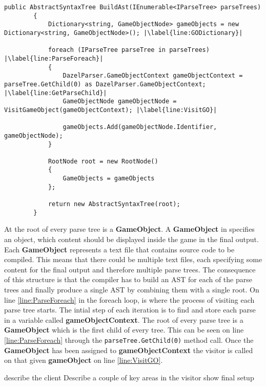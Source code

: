 \begin{lstlisting}[caption={The BuildAst method}, label={lst:BuildAstMethod},escapechar=|]
    public AbstractSyntaxTree BuildAst(IEnumerable<IParseTree> parseTrees)
        {
            Dictionary<string, GameObjectNode> gameObjects = new Dictionary<string, GameObjectNode>(); |\label{line:GODictionary}|
            
            foreach (IParseTree parseTree in parseTrees) |\label{line:ParseForeach}|
            {
                DazelParser.GameObjectContext gameObjectContext = parseTree.GetChild(0) as DazelParser.GameObjectContext; |\label{line:GetParseChild}|
                GameObjectNode gameObjectNode = VisitGameObject(gameObjectContext); |\label{line:VisitGO}|
                
                gameObjects.Add(gameObjectNode.Identifier, gameObjectNode);
            }

            RootNode root = new RootNode()
            {
                GameObjects = gameObjects
            };
            
            return new AbstractSyntaxTree(root);
        }
\end{lstlisting}

At the root of every parse tree is a \textbf{GameObject}. A \textbf{GameObject} in \dazel{} specifies an object, which content should be displayed inside the game in the final output. Each \textbf{GameObject} represents a text file that contains source code to be compiled. This means that there could be multiple text files, each specifying some content for the final output and therefore multiple parse trees. 
The consequence of this structure is that the compiler has to build an AST for each of the parse trees and finally produce a single AST by combining them with a single root. On line \ref{line:ParseForeach} in the foreach loop, is where the process of visiting each parse tree starts. 
The intial step of each iteration is to find and store each parse in a variable called \textbf{gameObjectContext}. The root of every parse tree is a \textbf{GameObject} which is the first child of every tree. This can be seen on line \ref{line:ParseForeach} through the \texttt{parseTree.GetChild(0)} method call.
Once the \textbf{GameObject} has been assigned to \textbf{gameObjectContext} the visitor is called on that given \textbf{gameObject} on line \ref{line:VisitGO}.
 









describe the client
Describe a couple of key areas in the visitor
show final setup
